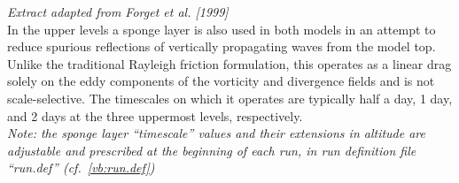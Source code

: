 {\it Extract adapted from Forget et al. [1999]}\\

In the upper levels a sponge layer is also used in both models
in an attempt to reduce
spurious reflections of vertically propagating waves from the model top.
Unlike the traditional Rayleigh friction formulation,
this operates as a linear drag
 solely on the eddy components of the vorticity and divergence
fields and is not scale-selective.  The timescales on which it operates
are
typically half a day, 1 day,  and 2 days
 at the three uppermost levels, respectively. \\

{\it Note: the sponge layer ``timescale'' values and their extensions in altitude
are adjustable and prescribed at the beginning of each run, in run definition file ``run.def'' (cf.~\ref{vb:run.def}) } 







